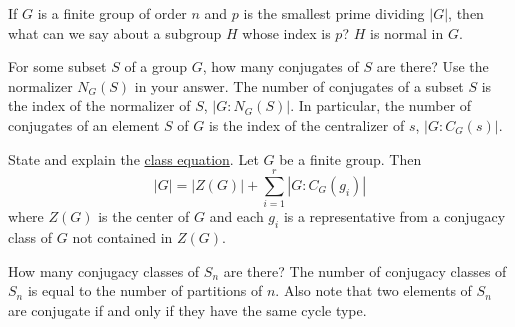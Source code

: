 \documentclass[avery5371,grid]{flashcards}
\newcommand{\inv}{^{-1}}
\DeclareMathOperator{\Aut}{Aut}
\begin{document}
\begin{flashcard}[Groups]{If $G$ is a finite group of order $n$ and $p$ is the smallest prime dividing $|G|$, then what can we say about a subgroup $H$ whose index is $p$?}
 $H$ is normal in $G$.
\end{flashcard}

\begin{flashcard}[Groups]{For some subset $S$ of a group $G$, how many conjugates of $S$ are there? Use the normalizer $N_G(S)$ in your answer.}
 The number of conjugates of a subset $S$ is the index of the normalizer of $S$, $|G:N_G(S)|$. In particular, the number of conjugates of an element $S$ of $G$ is the index of the centralizer of $s$, $|G:C_G(s)|$.
\end{flashcard}

\begin{flashcard}[Groups]{State and explain the \underline{class equation}.}
 Let $G$ be a finite group. Then
 $$
 |G| = |Z(G)| + \sum_{i=1}^r |G: C_G(g_i)|
 $$
 where $Z(G)$ is the center of $G$ and each $g_i$ is a representative from a conjugacy class of $G$ not contained in $Z(G)$.
\end{flashcard}

\begin{flashcard}[Groups]{How many conjugacy classes of $S_n$ are there?}
 The number of conjugacy classes of $S_n$ is equal to the number of partitions of $n$. Also note that two elements of $S_n$ are conjugate if and only if they have the same cycle type.
\end{flashcard}

% 
%  
\end{document}
